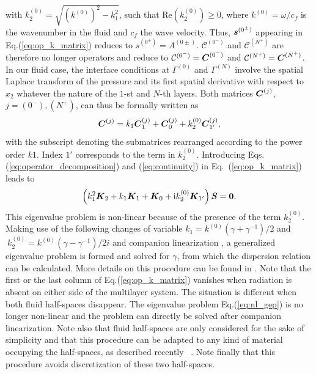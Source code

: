 with $ k_{2}^{(0)}=\sqrt{\left(k^{(0)}\right)^2- k_1^2}$, such that $\textrm{Re}\left( k_{2}^{(0)}\right)\geq 0$, where $k^{(0)} = \omega /c_f$ is the wavenumber in the fluid and $c_f$ the wave velocity. Thus, $\boldsymbol s^{(0^\pm)}$ appearing in  Eq.(\ref{eq:op_k_matrix}) reduces to $s^{(0^\pm)}=A^{(0\pm)}$. $\mathcal{C}^{(0^-)}$ and $\mathcal{C}^{(N^+)}$ are therefore no longer operators and reduce to $\mathcal{C}^{(0^-)}= \boldsymbol C^{(0^-)}$ and $\mathcal{C}^{(N^+)}=\boldsymbol C^{(N^+)}$. In our fluid case, the interface conditions at $\Gamma^{(0)}$ and $\Gamma^{(N)}$ involve the spatial Laplace transform of the pressure and its first spatial derivative with respect to $x_2$ whatever the nature of the $1$-st and $N$-th layers.  Both matrices $ \boldsymbol C^{(j)}$, $j=(0^-),(N^+)$, can thus be formally written as
    \begin{equation}
        \boldsymbol C^{(j)} = k_1 \boldsymbol C_1^{(j)}+\boldsymbol C_0^{(j)}+k_2^{(0)}\boldsymbol C_{1'}^{(j)},
        \label{eq:continuity}
    \end{equation}
with the subscript denoting the submatrices rearranged according to the power order $k1$. Index $1'$ corresponds to the term in $k_2^{(0)}$. Introducing Eqs.(\ref{eq:operator_decomposition}) and (\ref{eq:continuity}) in Eq.~(\ref{eq:op_k_matrix}) leads to
    \begin{equation}
       \left(  k_1^2 \boldsymbol K_2 +  k_1 \boldsymbol K_1 + \boldsymbol K_0 + \mathrm i k_2^{(0)} \boldsymbol K_{1'} \right) \boldsymbol S = \boldsymbol 0.
       \label{eq:nl_gep}
    \end{equation}
This eigenvalue problem is non-linear because of the presence of the term $k_2^{(0)}$. Making use of the following changes of variable $ k_1 = k^{(0)} \left(\gamma + \gamma^{-1} \right)/2$ and $\ k_2^{(0)}= k^{(0)} \left(\gamma - \gamma^{-1} \right)/2i$ \cite{hood2017, betcke2013} and companion linearization \cite{gohberg2009}, a generalized eigenvalue problem is formed and solved for $\gamma$, from which the dispersion relation can be calculated. More details on this procedure can be found in \cite{kiefer2019}. 
Note that the first or the last column of Eq.(\ref{eq:op_k_matrix}) vanishes when radiation is absent on either side of the multilayer system. The situation is different when both fluid half-spaces disappear. The eigenvalue problem Eq.(\ref{eq:nl_gep}) is no longer non-linear and the problem can directly be solved after companion linearization. Note also that fluid half-spaces are only considered for the sake of simplicity and that this procedure can be adapted to any kind of material occupying the half-spaces, as described recently ~\cite{gravenkamp2024}. Note finally that this procedure avoids discretization of these two half-spaces.
    
